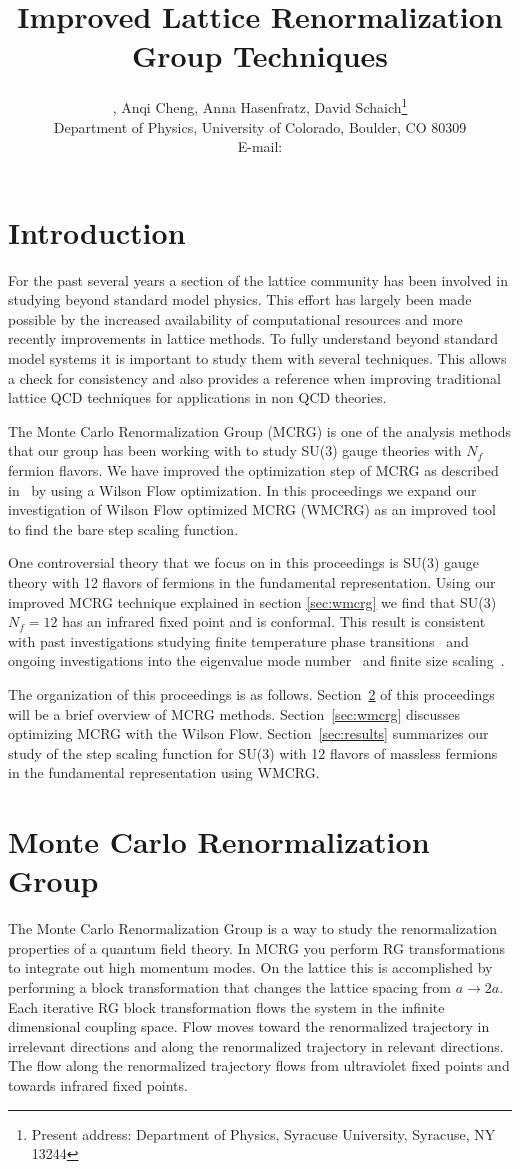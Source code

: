 \documentclass{PoS}
\title{Improved Lattice Renormalization Group Techniques}
\author{\speaker{Gregory Petropoulos}, Anqi Cheng, Anna Hasenfratz, David Schaich\footnote{Present address: Department of Physics, Syracuse University, Syracuse, NY 13244} \\
        Department of Physics, University of Colorado, Boulder, CO 80309 \\
        E-mail: \email{gregory.petropoulos@colorado.edu}}
\newcommand{\secref}[1]{Section~\ref{#1}}
\newcommand{\TODO}[1]{\textcolor{red}{{\bf #1}}}
\begin{document}
\section{Introduction}
For the past several years a section of the lattice community has been involved in studying beyond standard model physics.
This effort has largely been made possible by the increased availability of computational resources and more recently improvements in lattice methods.
To fully understand beyond standard model systems it is important to study them with several techniques.
This allows a check for consistency and also provides a reference when improving traditional lattice QCD techniques for applications in non QCD theories.

The Monte Carlo Renormalization Group (MCRG) is one of the analysis methods that our group has been working with to study SU(3) gauge theories with $N_f$ fermion flavors.
We have improved the optimization step of MCRG as described in~\cite{Petropoulos:2012mg} by using a Wilson Flow optimization.
In this proceedings we expand our investigation of Wilson Flow optimized MCRG (WMCRG) as an improved tool to find the bare step scaling function.

One controversial theory that we focus on in this proceedings is SU(3) gauge theory with 12 flavors of fermions in the fundamental representation.
Using our improved MCRG technique explained in section \ref{sec:wmcrg} we find that SU(3) $N_f = 12$ has an infrared fixed point and is conformal.
This result is consistent with past investigations studying finite temperature phase transitions~\TODO{\cite{}} and ongoing investigations into the eigenvalue mode number~\TODO{\cite{}} and finite size scaling~\cite{Hasenfratz:2013eka}.

The organization of this proceedings is as follows.
\secref{sec:mcrg} of this proceedings will be a brief overview of MCRG methods.
\secref{sec:wmcrg} discusses optimizing MCRG with the Wilson Flow.
\secref{sec:results} summarizes our study of the step scaling function for SU(3) with 12 flavors of massless fermions in the fundamental representation using WMCRG.



\section{Monte Carlo Renormalization Group}
\label{sec:mcrg}
The Monte Carlo Renormalization Group is a way to study the renormalization properties of a quantum field theory.
In MCRG you perform RG transformations to integrate out high momentum modes.
On the lattice this is accomplished by performing a block transformation that changes the lattice spacing from $a \to 2a$.
Each iterative RG block transformation flows the system in the infinite dimensional coupling space.
Flow moves toward the renormalized trajectory in irrelevant directions and along the renormalized trajectory in relevant directions.
The flow along the renormalized trajectory flows from ultraviolet fixed points and towards infrared fixed points.
\end{document}
